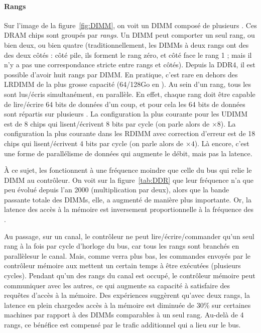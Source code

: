 
\paragraph{Rangs} Sur l'image de la figure~\ref{fig:DIMM}, on voit un DIMM
composé de plusieurs . Ces DRAM chips sont groupés par
\emph{rangs}. Un DIMM peut comporter un seul rang, ou bien deux, ou bien quatre
(traditionnellement, les DIMMs à deux rangs ont des  des
deux côtés : côté pile, ils forment le rang zéro, et côté face le rang 1 ; mais
il n'y a pas une correspondance stricte entre rangs et côtés). Depuis la DDR4,
il est possible d'avoir huit rangs par DIMM. En pratique, c'est rare en dehors
des LRDIMM de la plus grosse capacité (64/128Go en \the\year). Au sein d'un
rang, tous les  sont lus/écris simultanément, en
parallèle. En effet, chaque rang doit être capable de lire/écrire 64 bits de
données \og d'un coup\fg, et pour cela les 64 bits de données sont répartis sur
plusieurs . La configuration la plus courante pour les UDIMM
est de 8 chips qui lisent/écrivent 8 bits par cycle (on parle alors de \og
$\times 8$\fg). La configuration la plus courante dans les RDIMM avec correction
d'erreur est de 18 chips qui lisent/écrivent 4 bits par cycle (on parle alors de
$\times 4$). Là encore, c'est une forme de parallélisme de données qui augmente
le débit, mais pas la latence.

À ce sujet, les  fonctionnent à une fréquence moindre que
celle du bus qui relie le DIMM au contrôleur. On voit sur la
figure~\ref{tab:DDR} que leur fréquence n'a que peu évolué depuis l'an 2000
(multiplication par deux), alors que la bande passante totale des DIMMs, elle, a
augmenté de manière plus importante. Or, la latence des accès à la mémoire est
inversement proportionnelle à la fréquence des .

Au passage, sur un canal, le contrôleur ne peut lire/écrire/commander qu'un seul
rang à la fois par cycle d'horloge du bus, car tous les rangs sont branchés \og
en parallèle\fg sur le canal. Mais, comme verra plus bas, les commandes envoyés
par le contrôleur mémoire aux  mettent un certain temps à
être exécutées (plusieurs cycles). Pendant qu'un des rangs du canal est \og
occupé\fg, le contrôleur mémoire peut communiquer avec les autres, ce qui
augmente sa capacité à satisfaire des requêtes d'accès à la mémoire. Des
expériences suggèrent qu'avec deux rangs, la latence \og en plein charge\fg des
accès à la mémoire est diminuée de 30\% sur certaines machines par rapport à des
DIMMs comparables à un seul rang. Au-delà de 4 rangs, ce bénéfice est compensé
par le trafic additionnel qui a lieu sur le bus.

